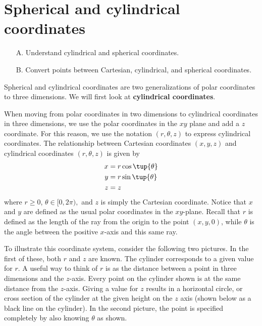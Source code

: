 \section{Spherical and cylindrical coordinates}

\begin{outcome}
\begin{enumerate}
\item[A.]  Understand cylindrical and spherical coordinates.

\item[B.]  Convert points between Cartesian, cylindrical, and spherical coordinates.
\end{enumerate}
\end{outcome}

Spherical and cylindrical coordinates are two generalizations of polar coordinates to three dimensions. We will first look at \textbf{cylindrical coordinates}.

When moving from polar coordinates in two dimensions to cylindrical coordinates in three dimensions, we use the polar coordinates in the $xy$
plane and add a $z$ coordinate. For this reason, we use the notation $(r, \theta, z)$ to express cylindrical coordinates.
The relationship between Cartesian coordinates $(x,y,z)$ and cylindrical coordinates $(r, \theta, z)$ is given by  
\begin{align*}
x& =r\cos \tup{\theta }  \\
y& =r\sin \tup{\theta }  \\
z& =z
\end{align*}
where $r\geq 0$, $\theta \in \lbrack 0,2\pi ),$ and $z$ is simply the Cartesian
coordinate. Notice that $x$ and $y$ are defined as the usual polar coordinates in the $xy$-plane. Recall that $r$ is defined as the length of the ray from the origin to the point $(x,y,0)$, while $\theta$ is the angle between the positive $x$-axis and this same ray. 

To illustrate this coordinate system, consider the following two pictures.
In the first of these, both $r$ and $z$ are known. The cylinder corresponds to a given value for $r$. A useful way to think of $r$ is
as the distance between a point in three dimensions and the $z$-axis. Every point on the cylinder shown is at the same distance from the $z$-axis. Giving a value for $z$ results in a horizontal circle, or cross section of the cylinder at the given height on the $z$ axis (shown below as a black line on the cylinder). In the second picture, the point is specified completely by also knowing $\theta$ as shown.

